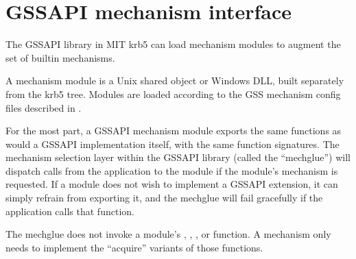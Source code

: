 \documentclass[letterpaper,10pt,english]{sphinxmanual}
\begin{document}
\begin{sphinxVerbatim}[commandchars=\\\{\}]
     
                     

     
                     
      
      
      
     
\end{sphinxVerbatim}


\section{GSSAPI mechanism interface}
\label{\detokenize{plugindev/gssapi:gssapi-mechanism-interface}}\label{\detokenize{plugindev/gssapi::doc}}
\sphinxAtStartPar
The GSSAPI library in MIT krb5 can load mechanism modules to augment
the set of built\sphinxhyphen{}in mechanisms.

\sphinxAtStartPar
A mechanism module is a Unix shared object or Windows DLL, built
separately from the krb5 tree.  Modules are loaded according to the
GSS mechanism config files described in .

\sphinxAtStartPar
For the most part, a GSSAPI mechanism module exports the same
functions as would a GSSAPI implementation itself, with the same
function signatures.  The mechanism selection layer within the GSSAPI
library (called the “mechglue”) will dispatch calls from the
application to the module if the module’s mechanism is requested.  If
a module does not wish to implement a GSSAPI extension, it can simply
refrain from exporting it, and the mechglue will fail gracefully if
the application calls that function.

\sphinxAtStartPar
The mechglue does not invoke a module’s ,
, , or
 function.  A mechanism only needs to
implement the “acquire” variants of those functions.
\end{document}
